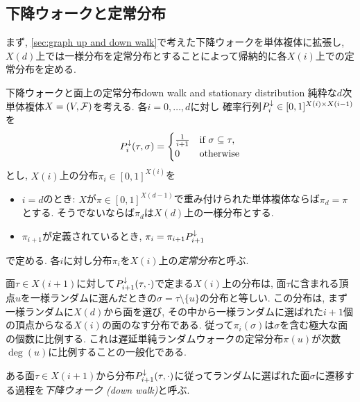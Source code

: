 \subsection{下降ウォークと定常分布}
まず, \cref{sec:graph up and down walk}で考えた下降ウォークを単体複体に拡張し, $X(d)$上では一様分布を定常分布とすることによって帰納的に各$X(i)$上での定常分布を定める.
\begin{definition}{下降ウォークと面上の定常分布}{down walk and stationary distribution}
    純粋な$d$次単体複体$X=(V,\mathcal{F})$を考える.
    各$i=0,\dots,d$に対し
        確率行列$P^{\downarrow}_i \in [0,1]^{X(i) \times X(i-1)}$を
        \[
            P^{\downarrow}_i(\tau,\sigma) = \begin{cases}
                \frac{1}{i+1}	& \text{if } \sigma \subseteq \tau,\\
                0 & \text{otherwise}
            \end{cases}
        \]
        とし, $X(i)$上の分布$\pi_i \in [0,1]^{X(i)}$を
        \begin{itemize}
        \item $i=d$のとき: $X$が$\pi \in [0,1]^{X(d-1)}$で重み付けられた単体複体ならば$\pi_d = \pi$とする. そうでないならば$\pi_d$は$X(d)$上の一様分布とする.
        \item $\pi_{i+1}$が定義されているとき, $\pi_i = \pi_{i+1}P^{\downarrow}_{i+1}$
        \end{itemize}
    で定める.
    各$i$に対し分布$\pi_i$を$X(i)$上の\emph{定常分布}と呼ぶ.
\end{definition}
面$\tau \in X(i+1)$に対して$P^{\downarrow}_{i+1}(\tau,\cdot)$で定まる$X(i)$上の分布は, 面$\tau$に含まれる頂点$u$を一様ランダムに選んだときの$\sigma = \tau \setminus\{u\}$の分布と等しい.
この分布は, まず一様ランダムに$X(d)$から面を選び, その中から一様ランダムに選ばれた$i+1$個の頂点からなる$X(i)$の面のなす分布である.
従って$\pi_i(\sigma)$は$\sigma$を含む極大な面の個数に比例する.
これは遅延単純ランダムウォークの定常分布$\pi(u)$が次数$\deg(u)$に比例することの一般化である.

ある面$\tau\in X(i+1)$から分布$P^{\downarrow}_{i+1}(\tau,\cdot)$に従ってランダムに選ばれた面$\sigma$に遷移する過程を\emph{下降ウォーク (down walk)}と呼ぶ.

